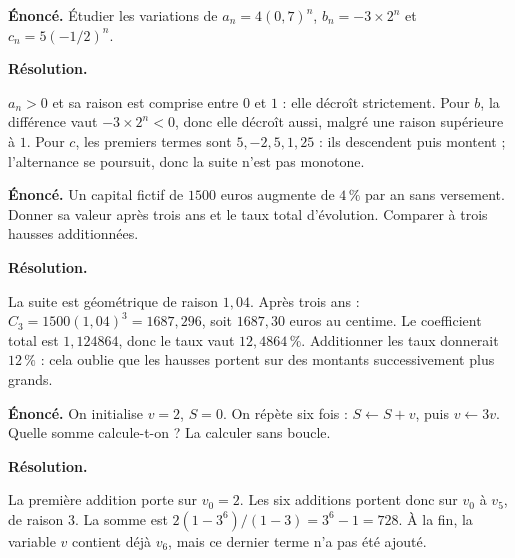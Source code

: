 \documentclass[11pt,a4paper]{article}
\begin{document}
\par\noindent\begin{minipage}{\linewidth}
{\small\color{Muted}\textbf{Énoncé.} Étudier les variations de $a_n=4(0,7)^n$, $b_n=-3\times2^n$ et $c_n=5(-1/2)^n$.}
\par\medskip
\textbf{Résolution.}\par
$a_n>0$ et sa raison est comprise entre $0$ et $1$ : elle décroît strictement. Pour $b$, la différence vaut $-3\times2^n<0$, donc elle décroît aussi, malgré une raison supérieure à $1$. Pour $c$, les premiers termes sont $5,-2,5,1,25$ : ils descendent puis montent ; l’alternance se poursuit, donc la suite n’est pas monotone.
\end{minipage}\par
\par\noindent\begin{minipage}{\linewidth}
{\small\color{Muted}\textbf{Énoncé.} Un capital fictif de $1500$ euros augmente de $4\,\%$ par an sans versement. Donner sa valeur après trois ans et le taux total d’évolution. Comparer à trois hausses additionnées.}
\par\medskip
\textbf{Résolution.}\par
La suite est géométrique de raison $1,04$. Après trois ans : $C_3=1500(1,04)^3=1687,296$, soit $1687,30$ euros au centime. Le coefficient total est $1,124864$, donc le taux vaut $12,4864\,\%$. Additionner les taux donnerait $12\,\%$ : cela oublie que les hausses portent sur des montants successivement plus grands.
\end{minipage}\par
\par\noindent\begin{minipage}{\linewidth}
{\small\color{Muted}\textbf{Énoncé.} On initialise $v=2$, $S=0$. On répète six fois : $S\leftarrow S+v$, puis $v\leftarrow3v$. Quelle somme calcule-t-on ? La calculer sans boucle.}
\par\medskip
\textbf{Résolution.}\par
La première addition porte sur $v_0=2$. Les six additions portent donc sur $v_0$ à $v_5$, de raison $3$. La somme est $2(1-3^6)/(1-3)=3^6-1=728$. À la fin, la variable $v$ contient déjà $v_6$, mais ce dernier terme n’a pas été ajouté.
\end{minipage}\par
\end{document}
